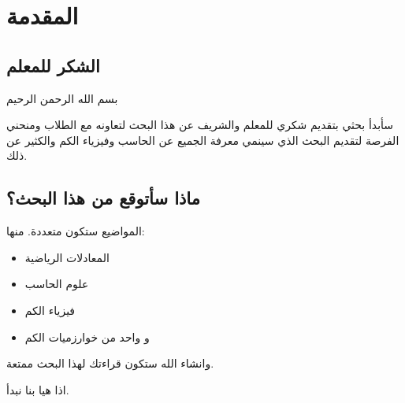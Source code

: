 \chapter{المقدمة}
\pagestyle{fancy}

\section{الشكر للمعلم}
بسم الله الرحمن الرحيم

سأبدأ بحثي بتقديم شكري للمعلم والشريف عن هذا البحث
لتعاونه مع الطلاب ومنحني الفرصة لتقديم البحث الذي سينمي معرفة الجميع عن الحاسب وفيزياء الكم والكثير عن ذلك.

\section{ماذا سأتوقع من هذا البحث؟}

المواضيع ستكون متعددة. منها:

\begin{itemize}
	\item المعادلات الرياضية
	\item علوم الحاسب
	\item فيزياء الكم
	\item و واحد من خوارزميات الكم
\end{itemize}

وانشاء الله ستكون قراءتك لهذا البحث ممتعة.

اذا هيا بنا نبدأ.
